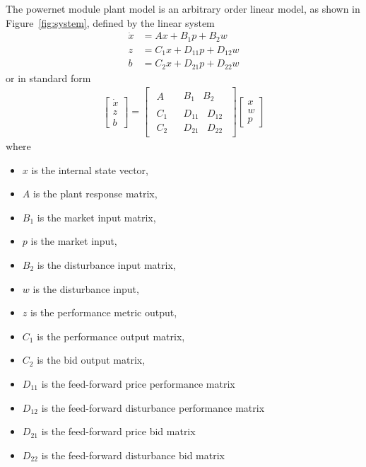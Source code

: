 \documentclass[12pt,letterpaper,twoside]{article}
\newcommand{\eqn}[2]{\begin{align}\label{eq:#1}#2\end{align}}
\newcommand{\subeqn}[2]{\begin{subequations}\eqn{#1}{#2}\end{subequations}}
\newcommand{\Matrix}[1]{\begin{bmatrix}#1\end{bmatrix}}
\newcommand{\Array}[2]{\begin{array}{#1}#2\end{array}}
\begin{document}
The powernet module plant model is an arbitrary order linear model, as shown in Figure~\ref{fig:system}, defined by the linear system
\subeqn {fullmodel}
{
	\dot x &= A x + B_1 p + B_2 w
\\
	z &= C_1 x + D_{11} p + D_{12} w
\\
	b &= C_2 x + D_{21} p + D_{22} w	
}
or in standard form
\eqn {stdmodel}
{
	\Matrix { \dot x \\ z \\ b } =
	\left[ \begin{array}{c|c}
		\Array{c}{A}
	&	\Array{cc}{B_1 & B_2}
	\\ \hline
		\Array{c}{C_1 \\ C_2}
	&	\Array{cc}{D_{11} & D_{12} \\ D_{21} & D_{22}}
	\end{array} \right]
	\Matrix { x \\ w \\ p }
}
where 
\begin{itemize}

\item $x$ is the internal state vector,

\item $A$ is the plant response matrix, 

\item $B_1$ is the market input matrix, 

\item $p$ is the market input, 

\item $B_2$ is the disturbance input matrix, 

\item $w$ is the disturbance input, 

\item $z$ is the performance metric output,

\item $C_1$ is the performance output matrix,

\item $C_2$ is the bid output matrix,

\item $D_{11}$ is the feed-forward price performance matrix

\item $D_{12}$ is the feed-forward disturbance performance matrix

\item $D_{21}$ is the feed-forward price bid matrix

\item $D_{22}$ is the feed-forward disturbance bid matrix


\end{itemize}
\end{document}
